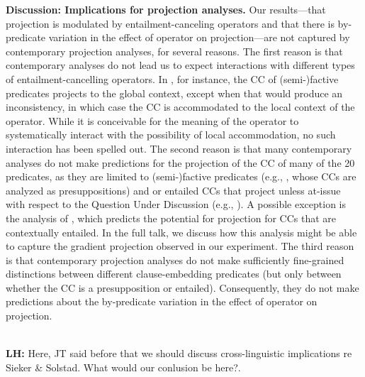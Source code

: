 \documentclass[12pt, a4paper]{article}
\begin{document}
\noindent
{\bf Discussion:  Implications for projection analyses.}
	Our results---that projection is modulated by entailment-canceling operators and that there is by-predicate variation in the effect of operator on projection---are not captured by contemporary projection analyses, for several reasons.
	The first reason is that contemporary analyses do not lead us to expect interactions with different types of entailment-cancelling operators. In \citealt{heim_projection_1983}, for instance, the CC of (semi-)factive predicates projects to the global context, except when that would produce an inconsistency, in which case the CC is accommodated to the local context of the operator. While it is conceivable for the meaning of the operator to systematically interact with the possibility of local accommodation, no such interaction has been spelled out.
	The second reason is that many contemporary analyses do not make predictions for the projection of the CC of many of the 20 predicates, as they are limited to (semi-)factive predicates (e.g., \citealt{heim_projection_1983,van_der_sandt_presupposition_1992}, whose CCs are analyzed as presuppositions) and or entailed CCs that project unless at-issue with respect to the Question Under Discussion (e.g., \citealt{abrusan_predicting_2011,simons_best_2017}). A possible exception is the analysis of \citealt{schlenker_triggering_2021}, which predicts the potential for projection for CCs that are contextually entailed. In the full talk, we discuss how this analysis might be able to capture the gradient projection observed in our experiment.
	The third reason is that contemporary projection analyses do not make sufficiently fine-grained distinctions between different clause-embedding predicates (but only between whether the CC is a presupposition or entailed). Consequently, they do not make predictions about the by-predicate variation in the effect of operator on projection.

 \\
	\noindent
	{\bfseries LH: } Here, JT said before that we should discuss cross-linguistic implications re Sieker \& Solstad. What would our conlusion be here?.\\
\end{document}

